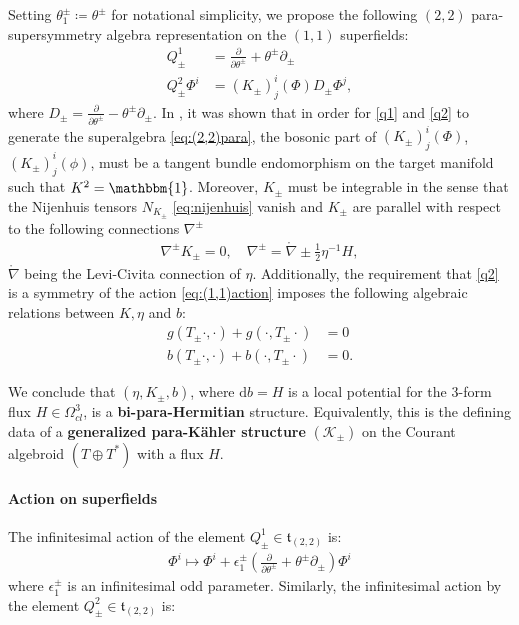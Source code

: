 \documentclass[letterpaper,12pt]{article}
\newcommand{\TT}{{T\oplus T^*}}
\newcommand{\KK}{\mathcal{K}}
\newcommand{\id}{\mathbbm{1}}
\newcommand{\lc}{\mathring{\n}}
\newcommand{\p}{\partial}
\newcommand{\n}{\nabla}
\newcommand{\rd}{\mathrm{d}}
\theoremstyle{definition}
\theoremstyle{remark}
\theoremstyle{examples}
\begin{document}
Setting $\theta^\pm_1\coloneqq \theta^\pm$ for notational simplicity, we propose the following $(2,2)$ para-supersymmetry algebra representation on the $(1,1)$ superfields:
\begin{align}
\label{q1} Q^1_\pm&=\frac{\p}{\p\theta^\pm}+\theta^\pm\p_\pm \\
\label{q2} Q^2_\pm\Phi^i&=(K_\pm)^i_j(\Phi)D_\pm\Phi^j,
\end{align}
where $D_\pm =\frac{\p}{\p\theta^\pm}-\theta^\pm\p_\pm$. In \cite{HullTwistedSUSY}, it was shown that in order for \eqref{q1} and \eqref{q2} to generate the superalgebra \eqref{eq:(2,2)para}, the bosonic part of $(K_\pm)^i_j(\Phi)$, $(K_\pm)^i_j(\phi)$, must be a tangent bundle endomorphism on the target manifold such that $K^2=\id$. Moreover, $K_\pm$ must be integrable in the sense that the Nijenhuis tensors $N_{K_\pm}$ \eqref{eq:nijenhuis} vanish and $K_\pm$ are parallel with respect to the following connections $\n^\pm$
\begin{align*}
\n^\pm K_\pm=0, \quad \n^\pm=\lc\pm\frac{1}{2}\eta^{-1}H,
\end{align*}
$\lc$ being the Levi-Civita connection of $\eta$. Additionally, the requirement that \eqref{q2} is a symmetry of the action \eqref{eq:(1,1)action} imposes the following algebraic relations between $K,\eta$ and $b$:
\begin{align*}
g(T_\pm\cdot,\cdot)+g(\cdot,T_\pm\cdot)&=0\\
b(T_\pm\cdot,\cdot)+b(\cdot,T_\pm\cdot)&=0.
\end{align*}

We conclude that $(\eta,K_\pm,b)$, where $\rd b=H$ is a local potential for the $3$-form flux $H\in\Omega_{cl}^3$, is a {\bf bi-para-Hermitian} structure. Equivalently, this is the defining data of a {\bf generalized para-K\"ahler structure} $(\KK_\pm)$ on the Courant algebroid $(\TT)$ with a flux $H$.



\paragraph{Action on superfields} The infinitesimal action of the element $Q^1_{\pm} \in \mathfrak{t}_{(2,2)}$ is:
\begin{align}\label{Q1_phi}
\Phi^i \mapsto \Phi^i + \epsilon^{\pm}_1 \left( \frac{\p}{\p\theta^\pm}+\theta^\pm\p_\pm \right) \Phi^i
\end{align}
where $\epsilon^{\pm}_1$ is an infinitesimal odd parameter. Similarly, the infinitesimal action by the element $Q^2_{\pm} \in \mathfrak{t}_{(2,2)}$ is:
\end{document}
